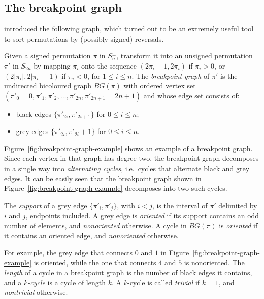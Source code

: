 \documentclass[review]{elsarticle}
\newcommand{\ie}{i.e.\ }
\begin{document}


\subsection{The breakpoint graph}

\citet{bafna-genome} introduced the following graph, which turned out to be an extremely useful tool to sort permutations by (possibly signed) reversals.

\begin{definition}
Given a signed permutation $\pi$ in $S^\pm_n$, transform it into an unsigned permutation $\pi'$ in $S_{2n}$ by mapping $\pi_i$ onto the sequence $(2\pi_i-1,2\pi_i)$ if $\pi_i>0$, or $(2|\pi_i|,2|\pi_i|-1)$ if $\pi_i<0$, for $1\leq i\leq n$. The \emph{breakpoint graph} of $\pi'$ is the undirected bicoloured graph $BG(\pi)$ with ordered vertex set $(\pi'_0=0,\pi'_1, \pi'_2, \ldots, \pi'_{2n},\pi'_{2n+1}=2n+1)$ and whose edge set consists of:
\begin{itemize}
\item black edges $\{\pi'_{2i}, \pi'_{2i+1}\}$ for $0\leq i\leq n$;
\item grey edges $\{\pi'_{2i}, \pi'_{2i}+1\}$ for $0\leq i\leq n$.
\end{itemize}
\end{definition}

Figure~\ref{fig:breakpoint-graph-example} shows an example of a breakpoint graph. Since each vertex in that graph has degree two, the breakpoint graph decomposes in a single way into \emph{alternating cycles}, \ie cycles that alternate black and grey edges. It can be easily seen that the breakpoint graph shown in Figure~\ref{fig:breakpoint-graph-example} decomposes into two such cycles.



\begin{definition}\label{def:orientation-of-grey-edges}
\cite{bergeron-elementary} 
The \emph{support} of a grey edge $\{\pi'_i, \pi'_j\}$, with $i<j$, is the interval of $\pi'$ delimited by $i$ and $j$, endpoints included. A grey edge is \emph{oriented} if its support contains an odd number of elements, and \emph{nonoriented} otherwise. A cycle in $BG(\pi)$ is \emph{oriented} if it contains an oriented edge, and \emph{nonoriented} otherwise.
\end{definition}

For example, the grey edge that connects $0$ and $1$ in Figure~\ref{fig:breakpoint-graph-example} is oriented, while the one that connects $4$ and $5$ is nonoriented. The \emph{length} of a cycle in a breakpoint graph is the number of black edges it contains, and a \emph{$k$-cycle} is a cycle of length $k$. A $k$-cycle is called \emph{trivial} if $k=1$, and \emph{nontrivial} otherwise.
\end{document}
